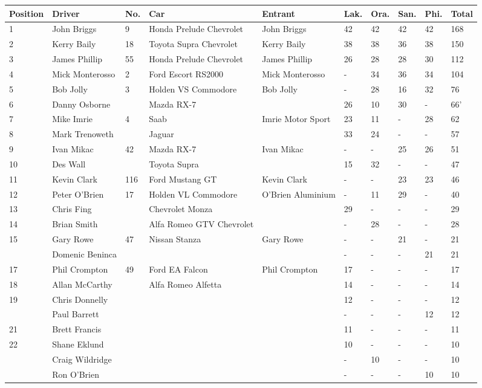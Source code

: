 \documentclass{article}
\begin{document}
\begin{tabular}{llllllllll}
\toprule
Position & Driver & No. & Car & Entrant & Lak. & Ora. & San. & Phi. & Total \\
\midrule
1 & John Briggs & 9 & Honda Prelude Chevrolet & John Briggs & 42 & 42 & 42 & 42 & 168 \\
2 & Kerry Baily & 18 & Toyota Supra Chevrolet & Kerry Baily & 38 & 38 & 36 & 38 & 150 \\
3 & James Phillip & 55 & Honda Prelude Chevrolet & James Phillip & 26 & 28 & 28 & 30 & 112 \\
4 & Mick Monterosso & 2 & Ford Escort RS2000 & Mick Monterosso & - & 34 & 36 & 34 & 104 \\
5 & Bob Jolly & 3 & Holden VS Commodore & Bob Jolly & - & 28 & 16 & 32 & 76 \\
6 & Danny Osborne &  & Mazda RX-7 &  & 26 & 10 & 30 & - & 66' \\
7 & Mike Imrie & 4 & Saab & Imrie Motor Sport & 23 & 11 & - & 28 & 62 \\
8 & Mark Trenoweth &  & Jaguar &  & 33 & 24 & - & - & 57 \\
9 & Ivan Mikac & 42 & Mazda RX-7 & Ivan Mikac & - & - & 25 & 26 & 51 \\
10 & Des Wall &  & Toyota Supra &  & 15 & 32 & - & - & 47 \\
11 & Kevin Clark & 116 & Ford Mustang GT & Kevin Clark & - & - & 23 & 23 & 46 \\
12 & Peter O'Brien & 17 & Holden VL Commodore & O'Brien Aluminium & - & 11 & 29 & - & 40 \\
13 & Chris Fing &  & Chevrolet Monza &  & 29 & - & - & - & 29 \\
14 & Brian Smith &  & Alfa Romeo GTV Chevrolet &  & - & 28 & - & - & 28 \\
15 & Gary Rowe & 47 & Nissan Stanza & Gary Rowe & - & - & 21 & - & 21 \\
 & Domenic Beninca &  &  &  & - & - & - & 21 & 21 \\
17 & Phil Crompton & 49 & Ford EA Falcon & Phil Crompton & 17 & - & - & - & 17 \\
18 & Allan McCarthy &  & Alfa Romeo Alfetta &  & 14 & - & - & - & 14 \\
19 & Chris Donnelly &  &  &  & 12 & - & - & - & 12 \\
 & Paul Barrett &  &  &  & - & - & - & 12 & 12 \\
21 & Brett Francis &  &  &  & 11 & - & - & - & 11 \\
22 & Shane Eklund &  &  &  & 10 & - & - & - & 10 \\
 & Craig Wildridge &  &  &  & - & 10 & - & - & 10 \\
 & Ron O'Brien &  &  &  & - & - & - & 10 & 10 \\
\bottomrule
\end{tabular}
\end{document}

